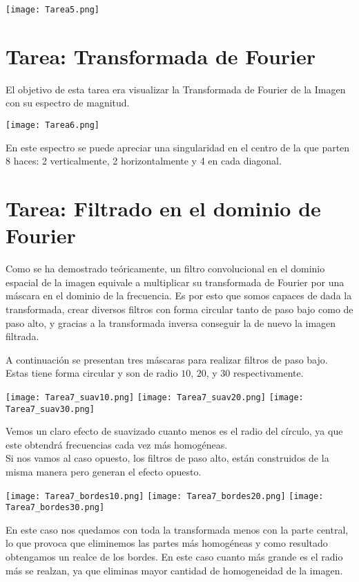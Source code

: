 \documentclass{article}
\begin{document}
\centering
\texttt{[image: Tarea5.png]}
\raggedright

\section{Tarea: Transformada de Fourier}

El objetivo de esta tarea era visualizar la Transformada de Fourier de la Imagen con su espectro de magnitud.

\centering
\texttt{[image: Tarea6.png]}
\raggedright

En este espectro se puede apreciar una singularidad en el centro de la que parten 8 haces: 2 verticalmente, 2 horizontalmente y 4 en cada diagonal.

\section{Tarea: Filtrado en el dominio de Fourier}

Como se ha demostrado teóricamente, un filtro convolucional en el dominio espacial de la imagen equivale a multiplicar su transformada de Fourier por una máscara en el dominio de la frecuencia. Es por esto que somos capaces de dada la transformada, crear diversos filtros con forma circular tanto de paso bajo como de paso alto, y gracias a la transformada inversa conseguir la de nuevo la imagen filtrada. 

A continuación se presentan tres máscaras para realizar filtros de paso bajo. Estas tiene forma circular y son de radio $10$, $20$, y $30$ respectivamente.

\centering
\texttt{[image: Tarea7\_suav10.png]}
\texttt{[image: Tarea7\_suav20.png]}
\texttt{[image: Tarea7\_suav30.png]}
\raggedright

Vemos un claro efecto de suavizado cuanto menos es el radio del círculo, ya que este obtendrá frecuencias cada vez más homogéneas.
\\
Si nos vamos al caso opuesto, los filtros de paso alto, están construidos de la misma manera pero generan el efecto opuesto.

\centering
\texttt{[image: Tarea7\_bordes10.png]}
\texttt{[image: Tarea7\_bordes20.png]}
\texttt{[image: Tarea7\_bordes30.png]}
\raggedright

En este caso nos quedamos con toda la transformada menos con la parte central, lo que provoca que eliminemos las partes más homogéneas y como resultado obtengamos un realce de los bordes. En este caso cuanto más grande es el radio más se realzan, ya que eliminas mayor cantidad de homogeneidad de la imagen.
\end{document}
